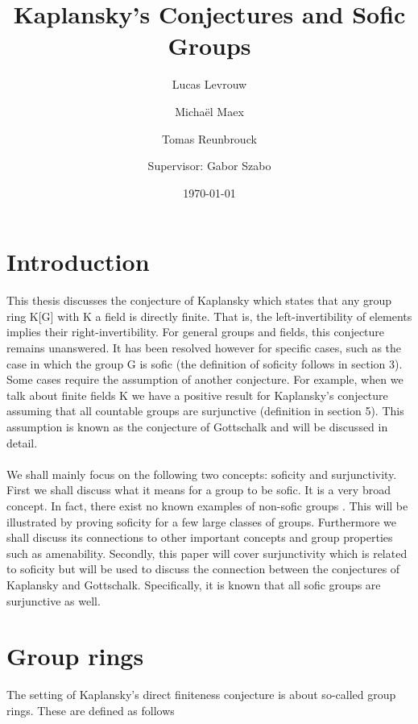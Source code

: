 \documentclass[titlepage, a4paper]{article}
\author{Lucas Levrouw \and Michaël Maex \and Tomas Reunbrouck \and Supervisor: Gabor Szabo}
\title{Kaplansky's Conjectures and Sofic Groups}
\date{\today}
\theoremstyle{remark}
\begin{document}
    \maketitle
{}
\tableofcontents
\pagebreak

\section{Introduction}\label{sec:intro}
This thesis discusses the conjecture of Kaplansky which states that any group ring K[G] with K a field is directly finite. That is, the left-invertibility of elements implies their right-invertibility. For general groups and fields, this conjecture remains unanswered. It has been resolved however for specific cases, such as the case in which the group G is sofic (the definition of soficity follows in section 3). Some cases require the assumption of another conjecture. For example, when we talk about finite fields K we have a positive result for Kaplansky’s conjecture assuming that all countable groups are surjunctive (definition in section 5). This assumption is known as the conjecture of Gottschalk and will be discussed in detail.\\
\\
We shall mainly focus on the following two concepts: soficity and surjunctivity. First we shall discuss what it means for a group to be sofic. It is a very broad concept. In fact, there exist no known examples of non-sofic groups \cite{weiss_2000}. This will be illustrated by proving soficity for a few large classes of groups. Furthermore we shall discuss its connections to other important concepts and group properties such as amenability. Secondly, this paper will cover surjunctivity which is related to soficity but will be used to discuss the connection between the conjectures of Kaplansky and Gottschalk. Specifically, it is known that all sofic groups are surjunctive as well.

\section{Group rings}\label{sec:group_rings}

The setting of Kaplansky's direct finiteness conjecture is about so-called group rings. These are defined as follows
\end{document}
